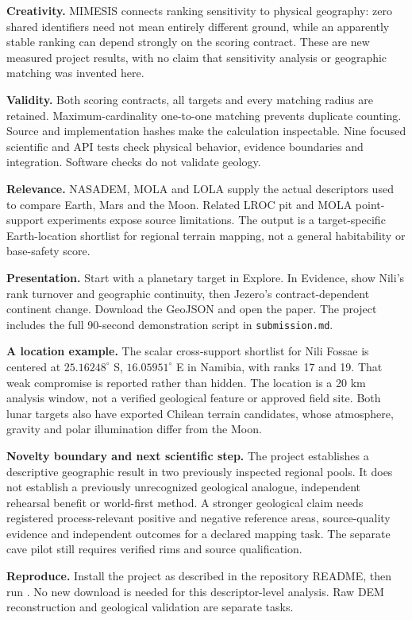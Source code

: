 \documentclass[11pt,a4paper]{article}
\begin{document}
\textbf{Creativity.} MIMESIS connects ranking sensitivity to physical geography: zero shared identifiers need not mean entirely different ground, while an apparently stable ranking can depend strongly on the scoring contract. These are new measured project results, with no claim that sensitivity analysis or geographic matching was invented here.

\textbf{Validity.} Both scoring contracts, all targets and every matching radius are retained. Maximum-cardinality one-to-one matching prevents duplicate counting. Source and implementation hashes make the calculation inspectable. Nine focused scientific and API tests check physical behavior, evidence boundaries and integration. Software checks do not validate geology.

\textbf{Relevance.} NASADEM, MOLA and LOLA supply the actual descriptors used to compare Earth, Mars and the Moon. Related LROC pit and MOLA point-support experiments expose source limitations. The output is a target-specific Earth-location shortlist for regional terrain mapping, not a general habitability or base-safety score.

\textbf{Presentation.} Start with a planetary target in Explore. In Evidence, show Nili's rank turnover and geographic continuity, then Jezero's contract-dependent continent change. Download the GeoJSON and open the paper. The project includes the full 90-second demonstration script in \texttt{submission.md}.

\textbf{A location example.} The scalar cross-support shortlist for Nili Fossae is centered at $25.16248^\circ$ S, $16.05951^\circ$ E in Namibia, with ranks 17 and 19. That weak compromise is reported rather than hidden. The location is a 20 km analysis window, not a verified geological feature or approved field site. Both lunar targets also have exported Chilean terrain candidates, whose atmosphere, gravity and polar illumination differ from the Moon.

\textbf{Novelty boundary and next scientific step.} The project establishes a descriptive geographic result in two previously inspected regional pools. It does not establish a previously unrecognized geological analogue, independent rehearsal benefit or world-first method. A stronger geological claim needs registered process-relevant positive and negative reference areas, source-quality evidence and independent outcomes for a declared mapping task. The separate cave pilot still requires verified rims and source qualification.

\textbf{Reproduce.} Install the project as described in the repository README, then run . No new download is needed for this descriptor-level analysis. Raw DEM reconstruction and geological validation are separate tasks.
\end{document}
